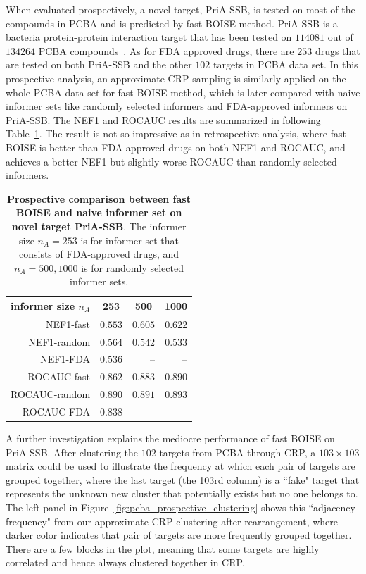 \documentclass[11pt,a4paper]{article}
\theoremstyle{plain}
\begin{document}
When evaluated prospectively, a novel target, PriA-SSB, is tested on most of the compounds in PCBA and is predicted by fast BOISE method. 
PriA-SSB is a bacteria protein-protein interaction target that has been tested on $114081$ out of $134264$ PCBA compounds~\citep{alnammi_evaluating_2021}. As for FDA approved drugs, there are $253$ drugs that are tested on both PriA-SSB and the other $102$ targets in PCBA data set. 
In this prospective analysis, an approximate CRP sampling is similarly applied on the whole PCBA data set for fast BOISE method, which is later compared with naive informer sets like randomly selected informers and FDA-approved informers on PriA-SSB. 
The NEF1 and ROCAUC results are summarized in following Table~\ref{tab:pcba_prospective}. The result is not so impressive as in retrospective analysis, where fast BOISE is better than FDA approved drugs on both NEF1 and ROCAUC, and achieves a better NEF1 but slightly worse ROCAUC than randomly selected informers.

\begin{table}[htbp]
\caption{\label{tab:pcba_prospective}  {\bf Prospective comparison between fast BOISE and naive informer set on novel target PriA-SSB}. The informer size $n_A = 253$ is for informer set that consists of FDA-approved drugs, and $n_A = 500, 1000$ is for randomly selected informer sets.}
\begin{tabular}{r|rrr}
\multicolumn{1}{c}{informer size $n_A$} & 
\multicolumn{1}{c}{253} & 
\multicolumn{1}{c}{500} & 
\multicolumn{1}{c}{1000} 
\\
 \hline
 NEF1-fast &  $0.553$ & $0.605$ & $0.622$ \\
 NEF1-random &  $0.564$ & $0.542$ & $0.533$ \\
 NEF1-FDA &  $0.536$ & -- & -- \\
 ROCAUC-fast & $0.862$ & $0.883$ & $0.890$ \\
 ROCAUC-random & $0.890$ & $0.891$ & $0.893$ \\
 ROCAUC-FDA & $0.838$ & -- & -- \\
 \hline
\end{tabular}
\end{table}

A further investigation explains the mediocre performance of fast BOISE on PriA-SSB.
After clustering the $102$ targets from PCBA through CRP, a $103\times 103$ matrix could be used to illustrate the frequency at which each pair of targets are grouped together,
where the last target (the 103rd column) is a ``fake" target that represents the unknown new cluster that potentially exists but no one belongs to. 
The left panel in Figure~\ref{fig:pcba_prospective_clustering} shows this ``adjacency frequency" from our approximate CRP clustering after rearrangement, where darker color indicates that pair of targets are more frequently grouped together. 
There are a few blocks in the plot, meaning that some targets are highly correlated and hence always clustered together in CRP. 
\end{document}

